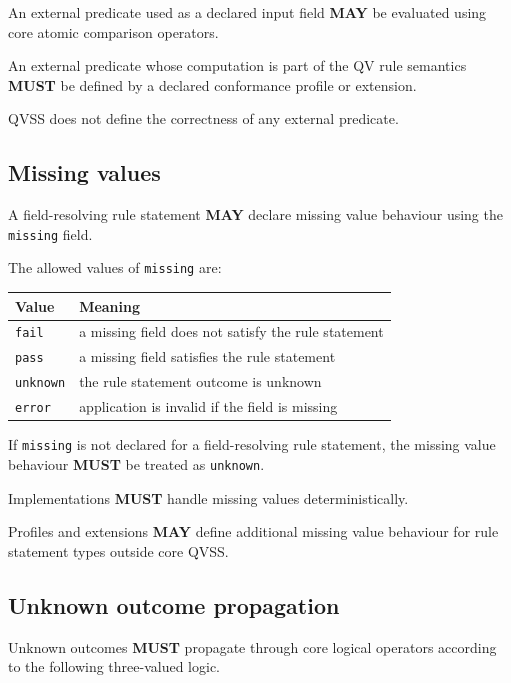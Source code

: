 \documentclass[11pt,a4paper]{article}
\begin{document}
An external predicate used as a declared input field \textbf{MAY} be evaluated using core atomic comparison operators.

An external predicate whose computation is part of the QV rule semantics \textbf{MUST} be defined by a declared conformance profile or extension.

QVSS does not define the correctness of any external predicate.

\subsection{Missing values}

A field-resolving rule statement \textbf{MAY} declare missing value behaviour using the \texttt{missing} field.

The allowed values of \texttt{missing} are:

\begin{center}
\begin{tabular}{ll}
\toprule
\textbf{Value} & \textbf{Meaning} \\
\midrule
\texttt{fail} & a missing field does not satisfy the rule statement \\
\texttt{pass} & a missing field satisfies the rule statement \\
\texttt{unknown} & the rule statement outcome is unknown \\
\texttt{error} & application is invalid if the field is missing \\
\bottomrule
\end{tabular}
\end{center}

If \texttt{missing} is not declared for a field-resolving rule statement, the missing value behaviour \textbf{MUST} be treated as \texttt{unknown}.

Implementations \textbf{MUST} handle missing values deterministically.

Profiles and extensions \textbf{MAY} define additional missing value behaviour for rule statement types outside core QVSS.

\subsection{Unknown outcome propagation}

Unknown outcomes \textbf{MUST} propagate through core logical operators according to the following three-valued logic.
\end{document}
